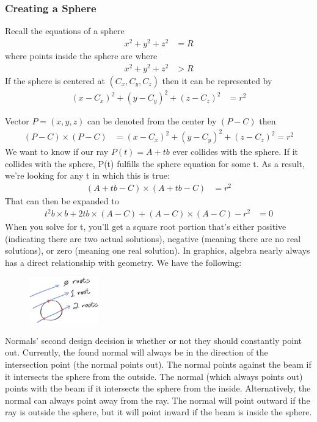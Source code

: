 \documentclass[conference]{IEEEtran}
\begin{document}
\subsubsection{Creating a Sphere}
Recall the equations of a sphere
\begin{align*}
x^2+y^2+z^2 &= R
\end{align*}
where points inside the sphere are where 
\begin{align*}
x^2+y^2+z^2 &> R
\end{align*}
If the sphere is centered at \((C_x, C_y, C_z)\) then it can be represented by 
\begin{align*}
(x-C_x)^2+(y-C_y)^2+(z-C_z)^2&=r^2
\end{align*}

Vector \(P=(x,y,z)\) can be denoted from the center by \((P-C)\) then
\begin{align*}
(P-C)\times(P-C)&=(x-C_x)^2+(y-C_y)^2+(z-C_z)^2=r^2
\end{align*}
We want to know if our ray \(P(t)=A+tb\) ever collides with the sphere. If it collides with the sphere, P(t) fulfills the sphere equation for some t. As a result, we're looking for any t in which this is true:
\begin{align*}
(A+tb-C)\times(A+tb-C)&=r^2
\end{align*}
That can then be expanded to
\begin{align*}
t^2b\times b+2tb\times(A-C)+(A-C)\times(A-C)-r^2&=0
\end{align*}
When you solve for t, you'll get a square root portion that's either positive (indicating there are two actual solutions), negative (meaning there are no real solutions), or zero (meaning one real solution). In graphics, algebra nearly always has a direct relationship with geometry. We have the following:
\begin{figure}[h]
\includegraphics[width=3cm]{images/ch4-3.jpg}
\centering
\end{figure}
Normals' second design decision is whether or not they should constantly point out. Currently, the found normal will always be in the direction of the intersection point (the normal points out). The normal points against the beam if it intersects the sphere from the outside. The normal (which always points out) points with the beam if it intersects the sphere from the inside. Alternatively, the normal can always point away from the ray. The normal will point outward if the ray is outside the sphere, but it will point inward if the beam is inside the sphere.
\end{document}
